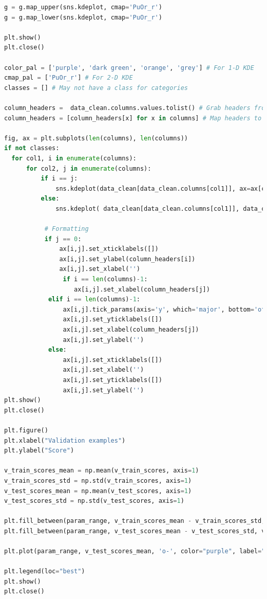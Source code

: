 \documentclass[jair,twoside,11pt,theapa]{article}
\begin{document}
\begin{lstlisting}[language=python]
g = g.map_upper(sns.kdeplot, cmap='PuOr_r')
g = g.map_lower(sns.kdeplot, cmap='PuOr_r')
 
plt.show()
plt.close()
 
color_pal = ['purple', 'dark green', 'orange', 'grey'] # For 1-D KDE
cmap_pal = ['PuOr_r'] # For 2-D KDE
classes = [] # May not have a class for categories

column_headers =  data_clean.columns.values.tolist() # Grab headers from df
column_headers = [column_headers[x] for x in columns] # Map headers to indices selected
 
fig, ax = plt.subplots(len(columns), len(columns))
if not classes:
  for col1, i in enumerate(columns):
      for col2, j in enumerate(columns):
          if i == j:
              sns.kdeplot(data_clean[data_clean.columns[col1]], ax=ax[col1][col2], color=color_pal[0], shade=True, legend=False)
          else:
              sns.kdeplot( data_clean[data_clean.columns[col1]], data_clean[data_clean.columns[col2]], ax=ax[col1][col2], cmap=cmap_pal[0])

           # Formatting
           if j == 0:
               ax[i,j].set_xticklabels([])
               ax[i,j].set_ylabel(column_headers[i])
               ax[i,j].set_xlabel('')
                if i == len(columns)-1:
                   ax[i,j].set_xlabel(column_headers[j])
            elif i == len(columns)-1:
                ax[i,j].tick_params(axis='y', which='major', bottom='off')
                ax[i,j].set_yticklabels([])
                ax[i,j].set_xlabel(column_headers[j])
                ax[i,j].set_ylabel('')            
            else:
                ax[i,j].set_xticklabels([])
                ax[i,j].set_xlabel('')            
                ax[i,j].set_yticklabels([])
                ax[i,j].set_ylabel('')
plt.show()
plt.close()
 
plt.figure()
plt.xlabel("Validation examples")
plt.ylabel("Score")
 
v_train_scores_mean = np.mean(v_train_scores, axis=1)
v_train_scores_std = np.std(v_train_scores, axis=1)
v_test_scores_mean = np.mean(v_test_scores, axis=1)
v_test_scores_std = np.std(v_test_scores, axis=1)
 
plt.fill_between(param_range, v_train_scores_mean - v_train_scores_std, v_train_scores_mean + v_train_scores_std, alpha=0.1, color="orange")
plt.fill_between(param_range, v_test_scores_mean - v_test_scores_std, v_test_scores_mean + v_test_scores_std, alpha=0.1, color="purple")plt.plot(param_range, v_train_scores_mean, 'o-', color="orange", label="Training score")
 
plt.plot(param_range, v_test_scores_mean, 'o-', color="purple", label="Cross-validation score")
 
plt.legend(loc="best")
plt.show()
plt.close()
\end{lstlisting}

\vskip 0.2in


\end{document}
